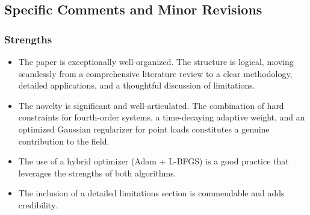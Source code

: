 \documentclass[11pt]{article}
\begin{document}
\subsection*{Specific Comments and Minor Revisions}

\subsubsection*{Strengths}
\begin{itemize}
    \item The paper is exceptionally well-organized. The structure is logical, moving seamlessly from a comprehensive literature review to a clear methodology, detailed applications, and a thoughtful discussion of limitations.
    \item The novelty is significant and well-articulated. The combination of hard constraints for fourth-order systems, a time-decaying adaptive weight, and an optimized Gaussian regularizer for point loads constitutes a genuine contribution to the field.
    \item The use of a hybrid optimizer (Adam + L-BFGS) is a good practice that leverages the strengths of both algorithms.
    \item The inclusion of a detailed limitations section is commendable and adds credibility.
\end{itemize}
\end{document}
